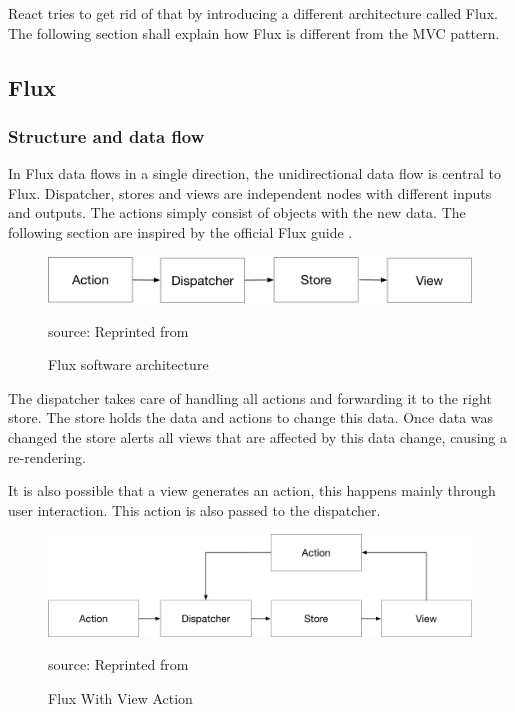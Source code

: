 React tries to get rid of that by introducing a different architecture called Flux. The following section shall explain how Flux is different from the MVC pattern.

\subsection{Flux}

\subsubsection{Structure and data flow}

In Flux data flows in a single direction, the unidirectional data flow is central to Flux. Dispatcher, stores and views are independent nodes with different inputs and outputs. The actions simply consist of objects with the new data. The following section are inspired by the official Flux guide \cite{Flux}.


\begin{figure}[H]
	\centering
	\includegraphics[width=0.8\linewidth]{bilder/grundlagen/UniDirection.png}
	\caption{Flux software architecture} source: Reprinted from \cite{Flux}
	\label{fig:FLUX}
\end{figure}

The dispatcher takes care of handling all actions and forwarding it to the right store. The store holds the data and actions to change this data. Once data was changed the store alerts all views that are affected by this data change, causing a re-rendering.

It is also possible that a view generates an action, this happens mainly through user interaction. This action is also passed to the dispatcher. 


\begin{figure}[H]
	\centering
	\includegraphics[width=0.8\linewidth]{bilder/grundlagen/uniDirection2.png}
	\caption{Flux With View Action} source: Reprinted from \cite{Flux}
	\label{fig:FA}
\end{figure}



